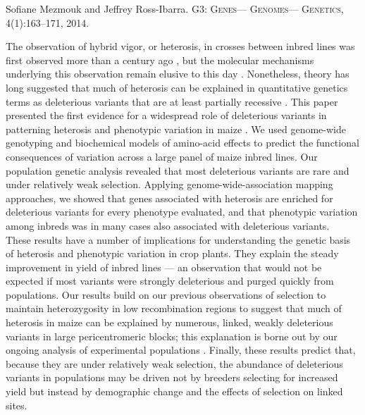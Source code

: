 \documentclass[11pt,letterpaper]{article}
\begin{document}
\large{ 
Sofiane Mezmouk and Jeffrey Ross-Ibarra.
\textsc{G3: Genes— Genomes— Genetics}, 4(1):163–171, 2014.}

\vspace{1cm}

\noindent The observation of hybrid vigor, or heterosis, in crosses between inbred lines was first observed more than a century ago \citep{shull1908composition,shull1914duplicate}, but the molecular mechanisms underlying this observation remain elusive to this day \citep{schnable2013progress, chen2013genomic}.
Nonetheless, theory has long suggested that much of heterosis can be explained in quantitative genetics terms as deleterious variants that are at least partially recessive \citep{charlesworth2009genetics}.
This paper presented the first evidence for a widespread role of deleterious variants in patterning heterosis and phenotypic variation in maize \citep{mezmouk2014pattern}.
We used genome-wide genotyping and biochemical models of amino-acid effects to predict the functional consequences of variation across a large panel of maize inbred lines.
Our population genetic analysis revealed that most deleterious variants are rare and under relatively weak selection.
Applying genome-wide-association mapping approaches, we showed that genes associated with heterosis are enriched for deleterious variants for every phenotype evaluated, and that phenotypic variation among inbreds was in many cases also associated with deleterious variants.\\

\noindent These results have a number of implications for understanding the genetic basis of heterosis and phenotypic variation in crop plants. 
They explain the steady improvement in yield of inbred lines --- an observation that would not be expected if most variants were strongly deleterious and purged quickly from populations.
Our results build on our previous observations of selection to maintain heterozygosity in low recombination regions \citep{gore2009a-first-generation} to suggest that much of heterosis in  maize can be explained by numerous, linked, weakly deleterious variants in large pericentromeric blocks; this explanation is borne out by our ongoing analysis of experimental populations \citep{gerke2013genomic}.
Finally, these results predict that, because they are under relatively weak selection, the abundance of deleterious variants in populations may be driven not by breeders selecting for increased yield but instead by demographic change and the effects of selection on linked sites.



\end{document}
